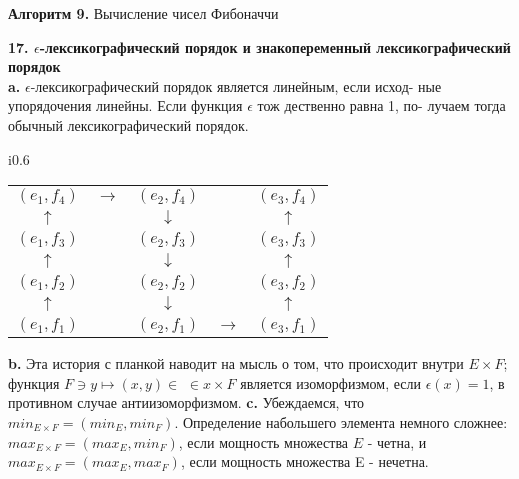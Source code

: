 \begin{center}
\textbf{Алгоритм 9.} Вычисление чисел Фибоначчи
\end{center}

\noindent\textbf{17. $\epsilon$-лексикографический порядок и знакопеременный лексикографический порядок}\\

\hspace*{15pt}\textbf{a.} $\epsilon$-лексикографический порядок является линейным, если исход-\linebreak
ные упорядочения линейны. Если функция $\epsilon$ тож дественно равна 1, по-\linebreak
лучаем тогда обычный лексикографический порядок.
\newpage



\begin{wraptable}{i}{0.6\textwidth}
\centering
\begin{tabular}{|ccccc|}
\hline
$(e_1,f_4)$ & $\rightarrow$ & $(e_2,f_4)$ &  & $(e_3,f_4)$ \\
$\uparrow$ &  & $\downarrow$ &  & $\uparrow$ \\
$(e_1,f_3)$ &  & $(e_2,f_3)$ &  & $(e_3,f_3)$ \\
$\uparrow$ &  & $\downarrow$ &  & $\uparrow$ \\
$(e_1,f_2)$ &  & $(e_2,f_2)$ &  & $(e_3,f_2)$ \\
$\uparrow$ &  & $\downarrow$ &  & $\uparrow$ \\
$(e_1,f_1)$ &  & $(e_2,f_1)$ & $\rightarrow$ & $(e_3,f_1)$ \\ \hline
\end{tabular}
\end{wraptable}
\textbf{b.} Эта история с планкой наводит на мысль о том, что происходит внутри $E\times F$; функция $F\ni y\longmapsto(x,y)\in$\linebreak
$\in x\times F$ является изоморфизмом, если $\epsilon(x)=1$, в противном случае антиизоморфизмом.\newline
\hspace*{15pt}\textbf{c.} Убеждаемся, что $min_{E\times F}=(min_E,min_F)$. Определение набольшего элемента немного сложнее:\newline
\hspace*{15pt}$max_{E\times F}=(max_E,min_F)$, если мощность множества $E$ - четна, и\linebreak
$max_{E\times F}=(max_E, max_F)$, если мощность множества E - нечетна.\newline
